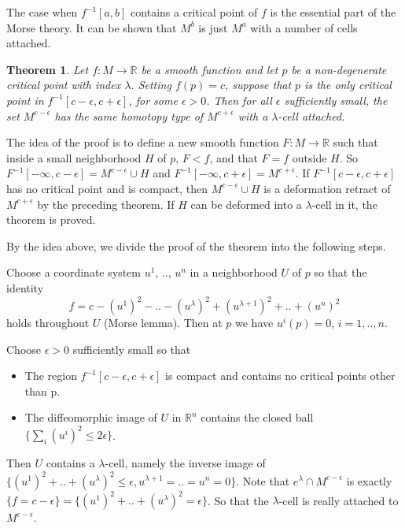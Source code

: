 \documentclass[a4paper,11pt,reqno]{amsart}
\newtheorem{thm}{Theorem}[section]
\newcommand{\RR}{\mathbb{R}}      %
\begin{document}
The case when $f^{-1}[a,b]$ contains a critical point of $f$ is the essential
part of the Morse theory. It can be shown that $M^b$ is just $M^a$ with a number
of cells attached.

\begin{thm}
  \label{3.2}
  Let $f: M \to \RR$ be a smooth function and let $p$ be a non-degenerate
  critical point with index $\lambda$. Setting $f(p) = c$, suppose that $p$ is
  the only critical point in $f^{-1}[c-\epsilon, c+\epsilon]$, for some
  $\epsilon > 0$. Then for all $\epsilon$ sufficiently small, the set
  $M^{c-\epsilon}$ has the same homotopy type of $M^{c+\epsilon}$ with a
  $\lambda$-cell attached.
\end{thm}

The idea of the proof is to define a new smooth function $F: M \to \RR$ such
that inside a small neighborhood $H$ of $p$, $F < f$, and that $F = f$ outside
$H$. So $F^{-1}[-\infty, c-\epsilon] = M^{c-\epsilon} \cup H$ and
$F^{-1}[-\infty,c+\epsilon] = M^{c+\epsilon}$. If $F^{-1}[c-\epsilon,
c+\epsilon]$ has no critical point and is compact, then $M^{c-\epsilon} \cup H$
is a deformation retract of $M^{c+\epsilon}$ by the preceding theorem. If $H$
can be deformed into a $\lambda$-cell in it, the theorem is proved.

By the idea above, we divide the proof of the theorem into the following
steps.

Choose a coordinate system $u^1$, .., $u^n$ in a neighborhood $U$ of $p$ so that
the identity
\begin{equation}
  f = c - (u^1)^2 - .. - (u^{\lambda})^2 + (u^{\lambda+1})^2 + .. + (u^{n})^2
\end{equation}
holds throughout $U$ (Morse lemma). Then at $p$ we have $u^i(p) = 0$, $i = 1,
.., n$.

Choose $\epsilon > 0$ sufficiently small so that
\begin{itemize}
\item The region $f^{-1}[c-\epsilon,c+\epsilon]$ is compact and contains no
  critical points other than p.
\item The diffeomorphic image of $U$ in $\RR^n$ contains the closed ball
  $\{\sum_i (u^i)^2 \le 2\epsilon\}$.
\end{itemize}

Then $U$ contains a $\lambda$-cell, namely the inverse image of
$\{(u^1)^2+..+(u^{\lambda})^2 \le \epsilon, u^{\lambda+1}=..=u^{n} = 0\}$. Note
that $e^\lambda \cap M^{c-\epsilon}$ is exactly $\{f = c- \epsilon\} =
\{(u^1)^2+..+(u^\lambda)^2 = \epsilon \}$. So that the $\lambda$-cell is really
attached to $M^{c-\epsilon}$.
\end{document}
